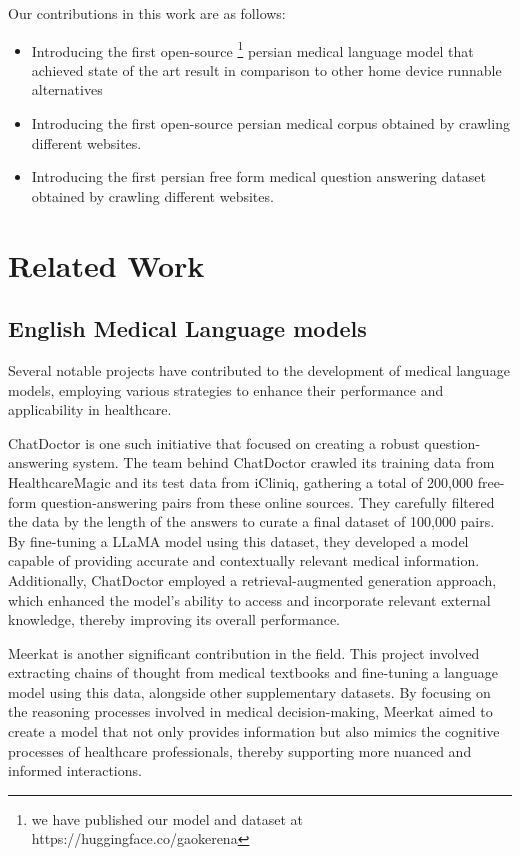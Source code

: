 \documentclass[conference]{IEEEtran}
\begin{document}
Our contributions in this work are as follows:
\begin{itemize}
	\item Introducing the first open-source
	\footnote{
	we have published our model and dataset at https://huggingface.co/gaokerena
	}
	persian medical language model that achieved state of the art result in
	comparison to other home device runnable alternatives
	\item Introducing the first open-source persian medical corpus obtained by crawling different websites.
	\item  Introducing the first persian free form medical question answering dataset obtained by crawling different websites.
\end{itemize}

\section{Related Work}

\subsection{English Medical Language models}
Several notable projects have contributed to the development of medical language models, employing various strategies to enhance their performance and applicability in healthcare.

ChatDoctor
\cite{b6}
is one such initiative that focused on creating a robust question-answering system. The team behind ChatDoctor crawled its training data from HealthcareMagic and its test data from iCliniq, gathering a total of 200,000 free-form question-answering pairs from these online sources. They carefully filtered the data by the length of the answers to curate a final dataset of 100,000 pairs. By fine-tuning a LLaMA model
\cite{b7}
using this dataset, they developed a model capable of providing accurate and contextually relevant medical information. Additionally, ChatDoctor employed a retrieval-augmented generation approach, which enhanced the model’s ability to access and incorporate relevant external knowledge, thereby improving its overall performance.

Meerkat
\cite{b8}
is another significant contribution in the field. This project involved extracting chains of thought from medical textbooks and fine-tuning a language model using this data, alongside other supplementary datasets. By focusing on the reasoning processes involved in medical decision-making, Meerkat aimed to create a model that not only provides information but also mimics the cognitive processes of healthcare professionals, thereby supporting more nuanced and informed interactions.
\end{document}
